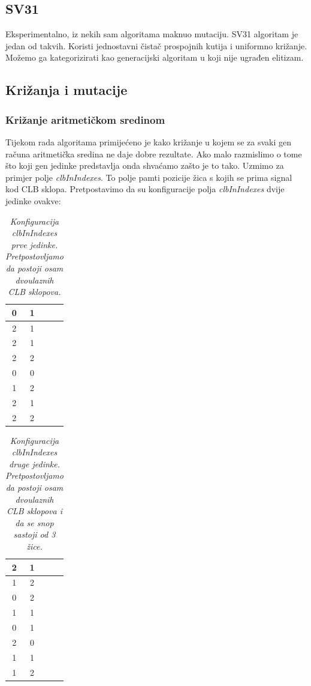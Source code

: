 \documentclass[times, utf8, zavrsni]{fer}
\begin{document}
\subsection{SV31}

Eksperimentalno, iz nekih sam algoritama maknuo mutaciju. SV31 algoritam je jedan od takvih. Koristi jednostavni čistač prospojnih kutija i uniformno križanje.
Možemo ga kategorizirati kao generacijski algoritam u koji nije ugrađen elitizam. 



\subsection{Križanja i mutacije}

\subsubsection{Križanje aritmetičkom sredinom}


Tijekom rada algoritama primijećeno je kako križanje u kojem se za svaki gen računa aritmetička sredina ne daje dobre rezultate. Ako malo razmislimo o tome što koji gen jedinke predstavlja onda shvaćamo zašto je to tako. Uzmimo za primjer polje \emph{clbInIndexes}. To polje pamti pozicije žica s kojih se prima signal kod CLB sklopa. Pretpostavimo da su konfiguracije polja \emph{clbInIndexes} dvije jedinke ovakve:

\begin{table}[H]
	\caption{\emph{Konfiguracija \emph{clbInIndexes} prve jedinke. Pretpostovljamo da postoji osam dvoulaznih CLB sklopova.}}
	\label{chromoClbIndex1}
	\centering
	\begin{tabular}{|c|c|c|c|} \hline
		0 & 1 \\ \hline
		2 & 1 \\ \hline
		2 & 1 \\ \hline
		2 & 2 \\ \hline
		0 & 0 \\ \hline
		1 & 2 \\ \hline
		2 & 1 \\ \hline
		2 & 2 \\ \hline
	\end{tabular}
\end{table}

\begin{table}[H]
	\caption{\emph{Konfiguracija \emph{clbInIndexes} druge jedinke. Pretpostovljamo da postoji osam dvoulaznih CLB sklopova i da se snop sastoji od 3 žice. }}
	\label{chromoClbIndex2}
	\centering
	\begin{tabular}{|c|c|c|c|} \hline
		2 & 1 \\ \hline
		1 & 2 \\ \hline
		0 & 2 \\ \hline
		1 & 1 \\ \hline
		0 & 1 \\ \hline
		2 & 0 \\ \hline
		1 & 1 \\ \hline
		1 & 2 \\ \hline
	\end{tabular}
\end{table} 
\end{document}
